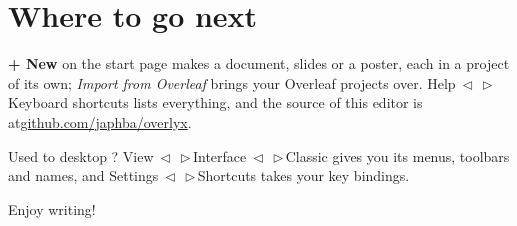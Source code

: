 \documentclass[english]{article}
\makeatletter
\providecommand{\LyX}{\texorpdfstring{\ensureascii{%
  L\kern-.1667em\lower.25em\hbox{Y}\kern-.125emX\@}}{LyX}}
\DeclareRobustCommand*{\lyxarrow}{%
\@ifstar
{\leavevmode\,$\triangleleft$\,\allowbreak}
{\leavevmode\,$\triangleright$\,\allowbreak}}
\makeatother
\begin{document}
\section{Where to go next}\label{sec:next}

\textbf{+ New} on the start page makes a document, slides or a poster, each in a project of its own; \emph{Import from Overleaf} brings your Overleaf projects over. Help\lyxarrow Keyboard shortcuts lists everything, and the source of this editor is at\href{https://github.com/japhba/overlyx}{github.com/japhba/overlyx}.

Used to desktop \LyX ? View\lyxarrow Interface\lyxarrow Classic gives you its menus, toolbars and names, and Settings\lyxarrow Shortcuts takes your key bindings.

Enjoy writing!



\end{document}

